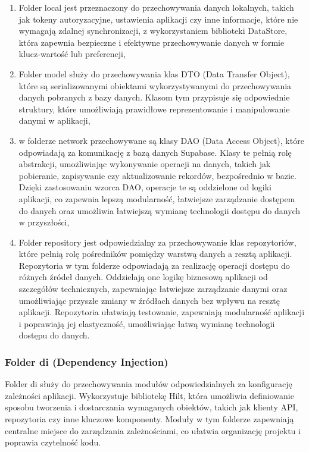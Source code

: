 \documentclass[12pt,twoside]{article}
\begin{document}
\begin{enumerate}[label=\alph*), leftmargin=1.25cm]
	\item Folder local jest przeznaczony do przechowywania danych lokalnych, takich jak tokeny autoryzacyjne, 
	ustawienia aplikacji czy inne informacje, które nie wymagają zdalnej synchronizacji, z wykorzystaniem biblioteki 
	DataStore, która zapewnia bezpieczne i efektywne przechowywanie danych w formie klucz-wartość lub preferencji,
	\item Folder model służy do przechowywania klas DTO (Data Transfer Object), które są serializowanymi obiektami 
	wykorzystywanymi do przechowywania danych pobranych z bazy danych. Klasom tym przypisuje się odpowiednie 
	struktury, które umożliwiają prawidłowe reprezentowanie i manipulowanie danymi w aplikacji,
	\item w folderze network przechowywane są klasy DAO (Data Access Object), które odpowiadają za komunikację z 
	bazą danych Supabase. Klasy te pełnią rolę abstrakcji, umożliwiając wykonywanie operacji na danych, takich jak 
	pobieranie, zapisywanie czy aktualizowanie rekordów, bezpośrednio w bazie. Dzięki zastosowaniu wzorca DAO, 
	operacje te są oddzielone od logiki aplikacji, co zapewnia lepszą modularność, łatwiejsze zarządzanie dostępem do 
	danych oraz umożliwia łatwiejszą wymianę technologii dostępu do danych w przyszłości,
	\item Folder repository jest odpowiedzialny za przechowywanie klas repozytoriów, które pełnią rolę pośredników 
	pomiędzy warstwą danych a resztą aplikacji. Repozytoria w tym folderze odpowiadają za realizację operacji dostępu 
	do różnych źródeł danych. Oddzielają one logikę biznesową aplikacji od szczegółów technicznych, zapewniając 
	łatwiejsze zarządzanie danymi oraz umożliwiając przyszłe zmiany w źródłach danych bez wpływu na resztę aplikacji. 
	Repozytoria ułatwiają testowanie, zapewniają modularność aplikacji i poprawiają jej elastyczność, umożliwiając 
	łatwą wymianę technologii dostępu do danych.
\end{enumerate}

\subsubsection{Folder di (Dependency Injection)}

Folder di służy do przechowywania modułów odpowiedzialnych za konfigurację zależności aplikacji. Wykorzystuje 
bibliotekę Hilt, która umożliwia definiowanie sposobu tworzenia i dostarczania wymaganych obiektów, takich jak 
klienty API, repozytoria czy inne kluczowe komponenty. Moduły w tym folderze zapewniają centralne miejsce do 
zarządzania zależnościami, co ułatwia organizację projektu i poprawia czytelność kodu.
\end{document}
